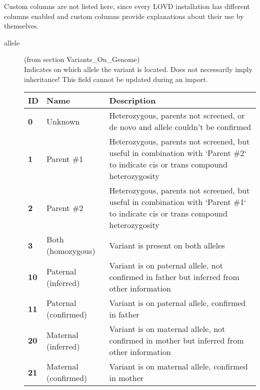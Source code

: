 Custom columns are not listed here, since every LOVD installation has different
 columns enabled and custom columns provide explanations about their use by themselves.

\begin{description}
  \item[allele] (from section Variants\_On\_Genome)\hfill \\
  Indicates on which allele the variant is located.
  Does not necessarily imply inheritance!
  This field cannot be updated during an import.\\
  \begin{tabular}{>{\bfseries}p{0.6cm} p{4.0cm} p{10.0cm}}
    ID & \textbf{Name} & \textbf{Description}\\ \hline \hline
    0 & Unknown & Heterozygous, parents not screened, or de novo and allele couldn't be confirmed\\ \hline
    1 & Parent \#1 & Heterozygous, parents not screened, but useful in combination with `Parent \#2` to indicate cis or
      trans compound heterozygosity\\ \hline
    2 & Parent \#2 & Heterozygous, parents not screened, but useful in combination with `Parent \#1` to indicate cis or
      trans compound heterozygosity\\ \hline
    3 & Both (homozygous) & Variant is present on both alleles\\ \hline
    10 & Paternal (inferred) & Variant is on paternal allele, not confirmed in father but inferred from other
      information\\ \hline
    11 & Paternal (confirmed) & Variant is on paternal allele, confirmed in father\\ \hline
    20 & Maternal (inferred) & Variant is on maternal allele, not confirmed in mother but inferred from other
      information\\ \hline
    21 & Maternal (confirmed) & Variant is on maternal allele, confirmed in mother\\ \hline
  \end{tabular}


\end{description}
